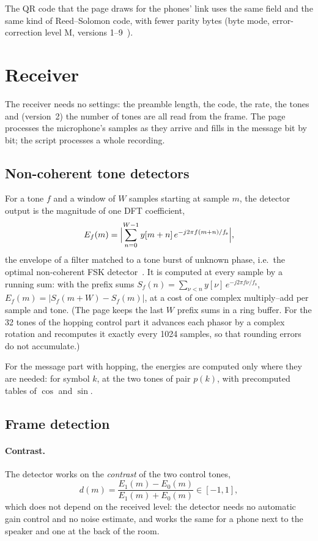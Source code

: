 \documentclass[11pt,a4paper]{article}
\newcommand{\fs}{f_{\mathrm{s}}}
\theoremstyle{remark}
\begin{document}
The QR code that the page draws for the phones' link uses the same field and the same kind of Reed--Solomon code, with fewer parity bytes (byte mode, error-correction level M, versions 1--9~\cite{qr}).

\section{Receiver}
\label{sec:rx}
The receiver needs no settings: the preamble length, the code, the rate, the tones and (version~2) the number of tones are all read from the frame. The page processes the microphone's samples as they arrive and fills in the message bit by bit; the script processes a whole recording.

\subsection{Non-coherent tone detectors}
\label{sec:energy}
For a tone $f$ and a window of $W$ samples starting at sample $m$, the detector output is the magnitude of one DFT coefficient,
\begin{equation}
E_f(m) = \Bigl| \sum_{n=0}^{W-1} y[m+n]\, e^{-j 2\pi f (m+n)/\fs} \Bigr| ,
\label{eq:energy}
\end{equation}
the envelope of a filter matched to a tone burst of unknown phase, i.e.\ the optimal non-coherent FSK detector~\cite{proakis}. It is computed at every sample by a running sum: with the prefix sums $S_f(n) = \sum_{\nu < n} y[\nu]\, e^{-j2\pi f\nu/\fs}$, $E_f(m) = |S_f(m+W) - S_f(m)|$, at a cost of one complex multiply--add per sample and tone. (The page keeps the last $W$ prefix sums in a ring buffer. For the 32 tones of the hopping control part it advances each phasor by a complex rotation and recomputes it exactly every 1024 samples, so that rounding errors do not accumulate.)

For the message part with hopping, the energies are computed only where they are needed: for symbol $k$, at the two tones of pair $p(k)$, with precomputed tables of $\cos$ and $\sin$.

\subsection{Frame detection}
\label{sec:detect}
\paragraph{Contrast.}
The detector works on the \emph{contrast} of the two control tones,
\begin{equation}
d(m) = \frac{E_1(m) - E_0(m)}{E_1(m) + E_0(m)} \in [-1, 1],
\end{equation}
which does not depend on the received level: the detector needs no automatic gain control and no noise estimate, and works the same for a phone next to the speaker and one at the back of the room.
\end{document}
